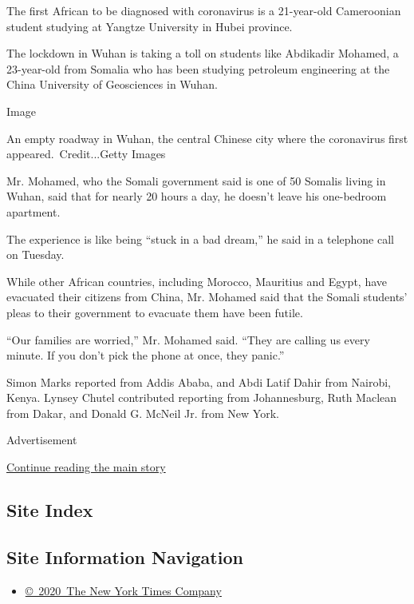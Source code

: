 The first African to be diagnosed with coronavirus is a 21-year-old
Cameroonian student studying at Yangtze University in Hubei province.

The lockdown in Wuhan is taking a toll on students like Abdikadir
Mohamed, a 23-year-old from Somalia who has been studying petroleum
engineering at the China University of Geosciences in Wuhan.

Image

An empty roadway in Wuhan, the central Chinese city where the
coronavirus first appeared.~Credit...Getty Images

Mr. Mohamed, who the Somali government said is one of 50 Somalis living
in Wuhan, said that for nearly 20 hours a day, he doesn't leave his
one-bedroom apartment.

The experience is like being ``stuck in a bad dream,'' he said in a
telephone call on Tuesday.

While other African countries, including Morocco, Mauritius and Egypt,
have evacuated their citizens from China, Mr. Mohamed said that the
Somali students' pleas to their government to evacuate them have been
futile.

``Our families are worried,'' Mr. Mohamed said. ``They are calling us
every minute. If you don't pick the phone at once, they panic.''

Simon Marks reported from Addis Ababa, and Abdi Latif Dahir from
Nairobi, Kenya. Lynsey Chutel contributed reporting from Johannesburg,
Ruth Maclean from Dakar, and Donald G. McNeil Jr. from New York.

Advertisement

\protect\hyperlink{after-bottom}{Continue reading the main story}

\hypertarget{site-index}{%
\subsection{Site Index}\label{site-index}}

\hypertarget{site-information-navigation}{%
\subsection{Site Information
Navigation}\label{site-information-navigation}}

\begin{itemize}
\tightlist
\item
  \href{https://help.nytimes.com/hc/en-us/articles/115014792127-Copyright-notice}{©~2020~The
  New York Times Company}
\end{itemize}


